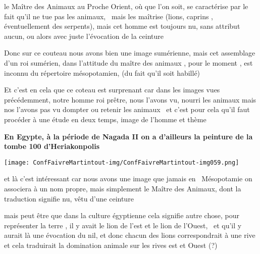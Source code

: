 \documentclass[a4paper]{article}
\begin{document}
{
le Maître des Animaux au Proche Orient, où que l'on soit, se caractérise
par le fait qu'il ne tue pas les animaux, \ mais les maîtrise (lions,
caprins , éventuellement des serpents), mais cet homme est toujours nu,
sans attribut aucun, ou alors avec juste l'évocation de la ceinture }


\bigskip

{
Donc sur ce couteau nous avons bien une image sumérienne, mais cet
assemblage d'un roi sumérien, dans l'attitude du maître des animaux ,
pour le moment , est inconnu du répertoire mésopotamien, (du fait qu'il
soit habillé)}

{
Et c'est en cela que ce coteau est surprenant car dans les images vues
précédemment, notre homme roi prêtre, nous l'avons vu, nourri les
animaux mais nos l'avons pas vu dompter ou retenir les animaux \ et
c'est pour cela qu'il faut procéder à une étude en deux temps, image de
l'homme et thème}


\bigskip

{
\textbf{En Egypte, à la période de Nagada II on a d'ailleurs la peinture
de la tombe 100 d'Heriakonpolis}}


\bigskip


\bigskip


\texttt{[image: ConfFaivreMartintout-img/ConfFaivreMartintout-img059.png]}



\bigskip


\bigskip

{
et là c'est intéressant car nous avons une image que jamais en
\ Mésopotamie on associera à un nom propre, mais simplement le Maître
des Animaux, dont la traduction signifie nu, vêtu d'une ceinture }


\bigskip

{
mais peut être que dans la culture égyptienne cela signifie autre chose,
pour représenter la terre , il y avait le lion de l'est et le lion de
l'Ouest, \ et qu'il y aurait là une évocation du nil, et donc chacun
des lions correspondrait à une rive et cela traduirait la domination
animale sur les rives est et Ouest (?)}
\end{document}
